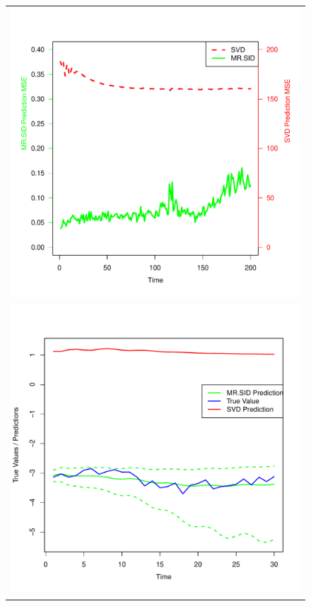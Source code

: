 \documentclass[times,twocolumn,final,authoryear]{elsarticle}
\begin{document}
\begin{figure}
\centering
\vspace*{-5mm}
\begin{tabular}{c}
\includegraphics[scale=0.45]{hcp_pred_accy.pdf}\\
\vspace*{-5mm}
\includegraphics[scale=0.4]{newSampleTS.pdf}\\

\end{tabular}
\end{figure}
\end{document}
